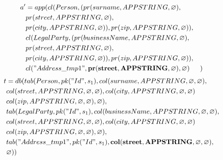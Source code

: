 \documentclass[11pt]{article}
\begin{document}
\hline
\begin{align*}
a' &=app(cl(Person, (pr(surname, APPSTRING, \varnothing), \\
& pr(street, APPSTRING, \varnothing), \\
& pr(city, APPSTRING, \varnothing)), pr(zip, APPSTRING, \varnothing)), \\
& cl(LegalParty, (pr(businessName, APPSTRING, \varnothing), \\
& pr(street, APPSTRING, \varnothing), \\
& pr(city, APPSTRING, \varnothing)), pr(zip, APPSTRING, \varnothing)), \\
& cl("Address\_tmp1", \mathbf{pr(street, APPSTRING, \varnothing)} , \varnothing)
& )
\end{align*}
\begin{align*}
t &=db(tab(Person, pk("Id", s_1), col(surname, APPSTRING, \varnothing, \varnothing), \\
& col(street, APPSTRING, \varnothing, \varnothing), col(city, APPSTRING, \varnothing, \varnothing) \\
& col(zip, APPSTRING, \varnothing, \varnothing), \varnothing), \\
& tab(LegalParty, pk("Id", s_1),  col(businessName, APPSTRING, \varnothing, \varnothing), \\
& col(street, APPSTRING, \varnothing, \varnothing), col(city, APPSTRING, \varnothing, \varnothing) \\
& col(zip, APPSTRING, \varnothing, \varnothing), \varnothing), \\
& tab("Address\_tmp1", pk("Id", s_1), \mathbf{col(street, APPSTRING, \varnothing, \varnothing)},\\
& \varnothing)) 
\end{align*}
\end{document}
